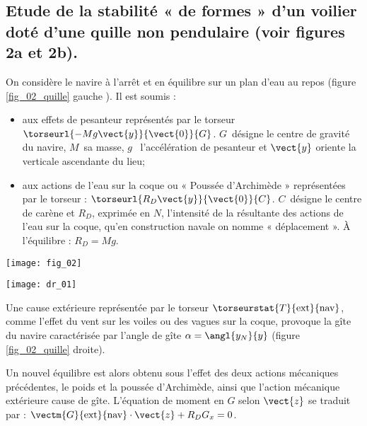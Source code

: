 \subsection{Etude de la stabilité « de formes » d’un voilier doté d’une quille non pendulaire (voir figures 2a et 2b).}

On considère le navire à l’arrêt et en équilibre sur un plan d’eau au repos (figure \ref{fig_02_quille} gauche ). Il est soumis :
\begin{itemize}
\item aux effets de pesanteur représentés par le torseur $\torseurl{-Mg\vect{y}}{\vect{0}}{G}$. $G$~désigne le centre de gravité du navire, $M$~sa masse, $g$~ l’accélération de pesanteur et $\vect{y}$ oriente la verticale ascendante du lieu; 
\item aux actions de l’eau sur la coque ou « Poussée d’Archimède » représentées par le torseur : $\torseurl{R_D\vect{y}}{\vect{0}}{C}$. $C$~désigne le centre de carène et $R_D$, exprimée en $N$,  l’intensité  de la résultante des actions de l’eau sur la coque, qu’en construction navale on nomme « déplacement ». À l’équilibre : $R_D = Mg$.
\end{itemize}

\begin{minipage}[c]{.47\linewidth}
\begin{center}
\texttt{[image: fig\_02]}
\end{center}
\end{minipage} \hfill
\begin{minipage}[c]{.47\linewidth}
\begin{center}
\texttt{[image: dr\_01]}
\end{center}
\end{minipage}

\vspace{.5cm}

Une cause extérieure représentée par le torseur $\torseurstat{T}{\text{ext}}{\text{nav}}$, comme l’effet du vent sur les voiles ou des vagues sur la coque, provoque la gîte du navire caractérisée par l’angle de gîte $\alpha=\angl{{y_N}}{{y}}$  (figure \ref{fig_02_quille} droite).

Un nouvel équilibre est alors obtenu sous l’effet des deux actions mécaniques précédentes, le poids et la poussée d’Archimède, ainsi que l’action mécanique extérieure cause de gîte.
L’équation de moment en $G$ selon $\vect{z}$ se traduit par : $\vectm{G}{\text{ext}}{\text{nav}}\cdot \vect{z} + R_D G_x = 0$.

